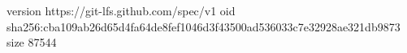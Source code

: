 version https://git-lfs.github.com/spec/v1
oid sha256:cba109ab26d65d4fa64de8fef1046d3f43500ad536033c7e32928ae321db9873
size 87544
